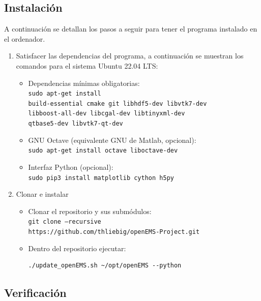\documentclass[
    11pt,
    spanish,
	a4paper
]{article}
\begin{document}
\subsection{Instalación}
\label{sub:oinstalacion}

A continuación se detallan los pasos a seguir para tener el programa instalado
en el ordenador.

\begin{enumerate}
  \item Satisfacer las dependencias del programa, a continuación se muestran los
    comandos para el sistema Ubuntu 22.04 LTS:
    \begin{itemize}
      \item Dependencias mínimas obligatorias:\\
        \texttt{sudo apt-get install\\
        build-essential cmake git libhdf5-dev libvtk7-dev\\
        libboost-all-dev libcgal-dev libtinyxml-dev\\
        qtbase5-dev libvtk7-qt-dev}
      \item GNU Octave (equivalente GNU de Matlab, opcional):\\
        \texttt{sudo apt-get install octave liboctave-dev}
      \item Interfaz Python (opcional):\\
        \texttt{sudo pip3 install matplotlib cython h5py}
    \end{itemize}
  \item Clonar e instalar
    \begin{itemize}
      \item Clonar el repositorio y sus submódulos:\\
        \texttt{git clone --recursive\\
          https://github.com/thliebig/openEMS-Project.git}
      \item Dentro del repositorio ejecutar:
        \begin{verbatim}
./update_openEMS.sh ~/opt/openEMS --python
        \end{verbatim}
    \end{itemize}
\end{enumerate}

\subsection{Verificación}
\label{sub:overificacion}
\end{document}
